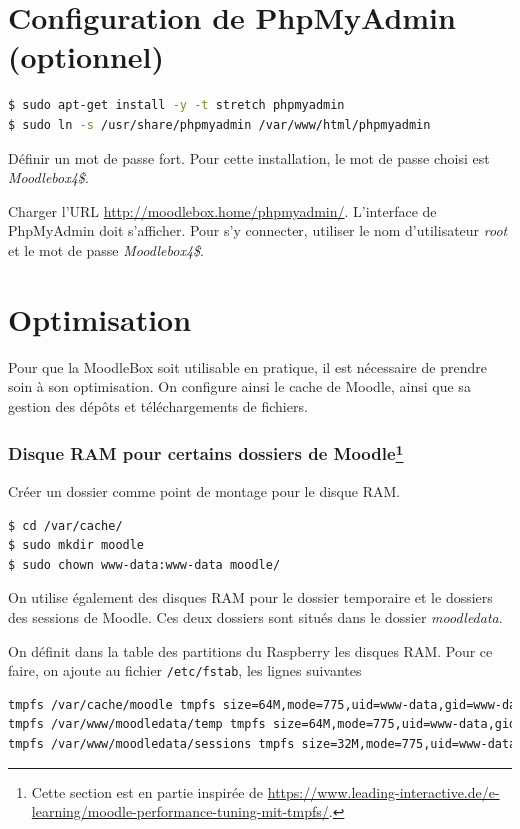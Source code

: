 \documentclass[11pt]{article}
\begin{document}
\section{Configuration de PhpMyAdmin (optionnel)}

\begin{lstlisting}[language=bash]
$ sudo apt-get install -y -t stretch phpmyadmin
$ sudo ln -s /usr/share/phpmyadmin /var/www/html/phpmyadmin
\end{lstlisting}
Définir un mot de passe fort. Pour cette installation, le mot de passe choisi est \emph{Moodlebox4\$}.

\begin{verification}
Charger l'URL \url{http://moodlebox.home/phpmyadmin/}. L'interface de PhpMyAdmin doit s'afficher. Pour s'y connecter, utiliser le nom d'utilisateur \emph{root} et le mot de passe \emph{Moodlebox4\$}.
\end{verification}

\section{Optimisation}

Pour que la MoodleBox soit utilisable en pratique, il est nécessaire de prendre soin à son optimisation. On configure ainsi le cache de Moodle, ainsi que sa gestion des dépôts et téléchargements de fichiers.

\subsubsection[Disque RAM pour certains dossiers de Moodle]{Disque RAM pour certains dossiers de Moodle\footnote{Cette section est en partie inspirée de \url{https://www.leading-interactive.de/e-learning/moodle-performance-tuning-mit-tmpfs/}.}}

Créer un dossier comme point de montage pour le disque RAM.
\begin{lstlisting}[language=bash]
$ cd /var/cache/
$ sudo mkdir moodle
$ sudo chown www-data:www-data moodle/
\end{lstlisting}

On utilise également des disques RAM pour le dossier temporaire et le dossiers des sessions de Moodle. Ces deux dossiers sont situés dans le dossier \emph{moodledata}.

On définit dans la table des partitions du Raspberry les disques RAM. Pour ce faire, on ajoute au fichier \lstinline{/etc/fstab}, les lignes suivantes
\begin{lstlisting}[language=bash]
tmpfs /var/cache/moodle tmpfs size=64M,mode=775,uid=www-data,gid=www-data 0 0
tmpfs /var/www/moodledata/temp tmpfs size=64M,mode=775,uid=www-data,gid=www-data 0 0
tmpfs /var/www/moodledata/sessions tmpfs size=32M,mode=775,uid=www-data,gid=www-data 0 0
\end{lstlisting}
\end{document}
